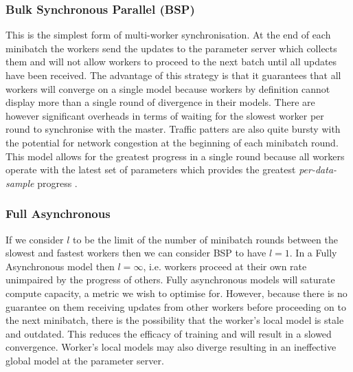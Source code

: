 \documentclass[12pt]{article}
\begin{document}
\subsubsection{Bulk Synchronous Parallel (BSP)}
This is the simplest form of multi-worker synchronisation. At the end of each minibatch the workers send the updates to the parameter server which collects them and will not allow workers to proceed to the next batch until all updates have been received. The advantage of this strategy is that it guarantees that all workers will converge on a single model because workers by definition cannot display more than a single round of divergence in their models. There are however significant overheads in terms of waiting for the slowest worker per round to synchronise with the master. Traffic patters are also quite bursty with the potential for network congestion at the beginning of each minibatch round. This model allows for the greatest progress in a single round because all workers operate with the latest set of parameters which provides the greatest \textit{per-data-sample} progress \cite{langford2009slow}.

\subsubsection{Full Asynchronous}
If we consider $l$ to be the limit of the number of minibatch rounds between the slowest and fastest workers then we can consider BSP to have $l = 1$. In a Fully Asynchronous model then $l = \infty$, i.e. workers proceed at their own rate unimpaired by the progress of others. Fully asynchronous models will saturate compute capacity, a metric we wish to optimise for. However, because there is no guarantee on them receiving updates from other workers before proceeding on to the next minibatch, there is the possibility that the worker's local model is stale and outdated. This reduces the efficacy of training and will result in a slowed convergence. Worker's local models may also diverge resulting in an ineffective global model at the parameter server.
\end{document}

